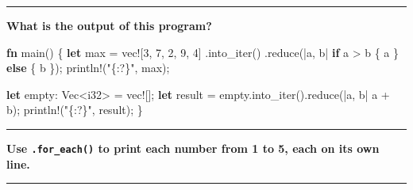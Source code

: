 \documentclass[
  11pt,
]{article}
\newenvironment{Shaded}{}{}
\newcommand{\ControlFlowTok}[1]{\textcolor[rgb]{0.00,0.44,0.13}{\textbf{#1}}}
\newcommand{\DataTypeTok}[1]{\textcolor[rgb]{0.56,0.13,0.00}{#1}}
\newcommand{\DecValTok}[1]{\textcolor[rgb]{0.25,0.63,0.44}{#1}}
\newcommand{\KeywordTok}[1]{\textcolor[rgb]{0.00,0.44,0.13}{\textbf{#1}}}
\newcommand{\NormalTok}[1]{#1}
\newcommand{\OperatorTok}[1]{\textcolor[rgb]{0.40,0.40,0.40}{#1}}
\newcommand{\PreprocessorTok}[1]{\textcolor[rgb]{0.74,0.48,0.00}{#1}}
\newcommand{\StringTok}[1]{\textcolor[rgb]{0.25,0.44,0.63}{#1}}
\begin{document}
\begin{center}\rule{0.5\linewidth}{0.5pt}\end{center}

\textbf{What is the output of this program?}

\begin{Shaded}
\begin{Highlighting}[]
\KeywordTok{fn}\NormalTok{ main() }\OperatorTok{\{}
    \KeywordTok{let}\NormalTok{ max }\OperatorTok{=} \PreprocessorTok{vec!}\NormalTok{[}\DecValTok{3}\OperatorTok{,} \DecValTok{7}\OperatorTok{,} \DecValTok{2}\OperatorTok{,} \DecValTok{9}\OperatorTok{,} \DecValTok{4}\NormalTok{]}
        \OperatorTok{.}\NormalTok{into\_iter()}
        \OperatorTok{.}\NormalTok{reduce(}\OperatorTok{|}\NormalTok{a}\OperatorTok{,}\NormalTok{ b}\OperatorTok{|} \ControlFlowTok{if}\NormalTok{ a }\OperatorTok{\textgreater{}}\NormalTok{ b }\OperatorTok{\{}\NormalTok{ a }\OperatorTok{\}} \ControlFlowTok{else} \OperatorTok{\{}\NormalTok{ b }\OperatorTok{\}}\NormalTok{)}\OperatorTok{;}
    \PreprocessorTok{println!}\NormalTok{(}\StringTok{"\{:?\}"}\OperatorTok{,}\NormalTok{ max)}\OperatorTok{;}

    \KeywordTok{let}\NormalTok{ empty}\OperatorTok{:} \DataTypeTok{Vec}\OperatorTok{\textless{}}\DataTypeTok{i32}\OperatorTok{\textgreater{}} \OperatorTok{=} \PreprocessorTok{vec!}\NormalTok{[]}\OperatorTok{;}
    \KeywordTok{let}\NormalTok{ result }\OperatorTok{=}\NormalTok{ empty}\OperatorTok{.}\NormalTok{into\_iter()}\OperatorTok{.}\NormalTok{reduce(}\OperatorTok{|}\NormalTok{a}\OperatorTok{,}\NormalTok{ b}\OperatorTok{|}\NormalTok{ a }\OperatorTok{+}\NormalTok{ b)}\OperatorTok{;}
    \PreprocessorTok{println!}\NormalTok{(}\StringTok{"\{:?\}"}\OperatorTok{,}\NormalTok{ result)}\OperatorTok{;}
\OperatorTok{\}}
\end{Highlighting}
\end{Shaded}

\begin{center}\rule{0.5\linewidth}{0.5pt}\end{center}

\textbf{Use \texttt{.for\_each()} to print each number from 1 to 5, each
on its own line.}

\begin{Shaded}
\begin{Highlighting}[]

\end{Highlighting}
\end{Shaded}

\begin{center}\rule{0.5\linewidth}{0.5pt}\end{center}
\end{document}
